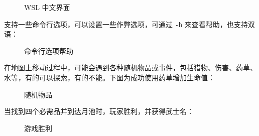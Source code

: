 \documentclass[hyperref,UTF8,a4paper]{ctexart}
\newcommand{\includegraphicx}[1]{\maxsizebox{\textwidth}{\textheight}{\texttt{[image: \#1]}}}
\begin{document}
\begin{figure}[H]
\centering
\includegraphicx{img/cnnew.png}
\caption{WSL 中文界面}
\end{figure}

支持一些命令行选项，可以设置一些作弊选项，可通过 \texttt{-h}
来查看帮助，也支持双语：

\begin{figure}[H]
\centering
\includegraphicx{img/help.png}
\caption{命令行选项帮助}
\end{figure}

在地图上移动过程中，可能会遇到各种随机物品或事件，包括猎物、伤害、药草、水等，有的可以探索，有的不能。下图为成功使用药草增加生命值：

\begin{figure}[H]
\centering
\includegraphicx{img/benefit.png}
\caption{随机物品}
\end{figure}

当找到四个必需品并到达月池时，玩家胜利，并获得武士名：

\begin{figure}[H]
\centering
\includegraphicx{img/victory.png}
\caption{游戏胜利}
\end{figure}
\end{document}
